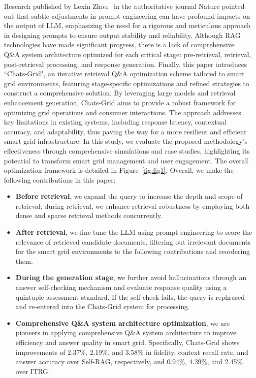 Research published by Lexin Zhou~\cite{zhou2024larger} in the authoritative journal Nature pointed out that subtle adjustments in prompt engineering can have profound impacts on the output of LLM, emphasizing the need for a rigorous and meticulous approach in designing prompts to ensure output stability and reliability. Although RAG technologies have made significant progress, there is a lack of comprehensive Q\&A system architecture optimized for each critical stage: pre-retrieval, retrieval, post-retrieval processing, and response generation. Finally, this paper introduces ``Chats-Grid", an iterative retrieval Q\&A optimization scheme tailored to smart grid environments, featuring stage-specific optimizations and refined strategies to construct a comprehensive solution. By leveraging large models and retrieval enhancement generation, Chats-Grid aims to provide a robust framework for optimizing grid operations and consumer interactions. The approach addresses key limitations in existing systems, including response latency, contextual accuracy, and adaptability, thus paving the way for a more resilient and efficient smart grid infrastructure. In this study, we evaluate the proposed methodology's effectiveness through comprehensive simulations and case studies, highlighting its potential to transform smart grid management and user engagement. The overall optimization framework is detailed in Figure~\ref{fig:fig1}. Overall, we make the following contributions in this paper:
\begin{itemize}
    \item \textbf{Before retrieval}, we expand the query to increase the depth and scope of retrieval; during retrieval, we enhance retrieval robustness by employing both dense and sparse retrieval methods concurrently.

\item \textbf{After retrieval}, we fine-tune the LLM using prompt engineering to score the relevance of retrieved candidate documents, filtering out irrelevant documents for the smart grid environments to the following contributions and reordering them.

\item \textbf{During the generation stage}, we further avoid hallucinations through an answer self-checking mechanism and evaluate response quality using a quintuple assessment standard. If the self-check fails, the query is rephrased and re-entered into the Chats-Grid system for processing.

\item \textbf{Comprehensive Q\&A system architecture optimization}, we are pioneers in applying comprehensive Q\&A system architecture to improve efficiency and  answer quality in smart grid. Specifically, Chats-Grid shows improvements of 2.37\%, 2.19\%, and 3.58\% in fidelity, context recall rate, and answer accuracy over Self-RAG, respectively, and 0.94\%, 4.39\%, and 2.45\% over ITRG.
\end{itemize}


